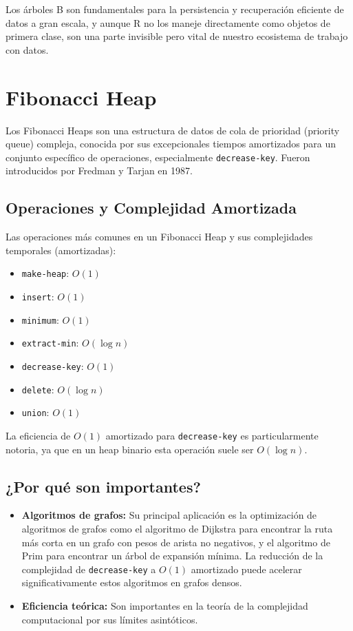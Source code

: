 \documentclass[
  spanish,
  letterpaper,
  DIV=11,
  numbers=noendperiod]{scrreprt}
\providecommand{\tightlist}{%
  \setlength{\itemsep}{0pt}\setlength{\parskip}{0pt}}
\begin{document}
Los árboles B son fundamentales para la persistencia y recuperación
eficiente de datos a gran escala, y aunque R no los maneje directamente
como objetos de primera clase, son una parte invisible pero vital de
nuestro ecosistema de trabajo con datos.

\section{Fibonacci Heap}\label{fibonacci-heap}

Los Fibonacci Heaps son una estructura de datos de cola de prioridad
(priority queue) compleja, conocida por sus excepcionales tiempos
amortizados para un conjunto específico de operaciones, especialmente
\texttt{decrease-key}. Fueron introducidos por Fredman y Tarjan en 1987.

\subsection{Operaciones y Complejidad
Amortizada}\label{operaciones-y-complejidad-amortizada}

Las operaciones más comunes en un Fibonacci Heap y sus complejidades
temporales (amortizadas):

\begin{itemize}
\tightlist
\item
  \texttt{make-heap}: \(O(1)\)
\item
  \texttt{insert}: \(O(1)\)
\item
  \texttt{minimum}: \(O(1)\)
\item
  \texttt{extract-min}: \(O(\log n)\)
\item
  \texttt{decrease-key}: \(O(1)\)
\item
  \texttt{delete}: \(O(\log n)\)
\item
  \texttt{union}: \(O(1)\)
\end{itemize}

La eficiencia de \(O(1)\) amortizado para \texttt{decrease-key} es
particularmente notoria, ya que en un heap binario esta operación suele
ser \(O(\log n)\).

\subsection{¿Por qué son
importantes?}\label{por-quuxe9-son-importantes-2}

\begin{itemize}
\tightlist
\item
  \textbf{Algoritmos de grafos:} Su principal aplicación es la
  optimización de algoritmos de grafos como el algoritmo de Dijkstra
  para encontrar la ruta más corta en un grafo con pesos de arista no
  negativos, y el algoritmo de Prim para encontrar un árbol de expansión
  mínima. La reducción de la complejidad de \texttt{decrease-key} a
  \(O(1)\) amortizado puede acelerar significativamente estos algoritmos
  en grafos densos.
\item
  \textbf{Eficiencia teórica:} Son importantes en la teoría de la
  complejidad computacional por sus límites asintóticos.
\end{itemize}
\end{document}

